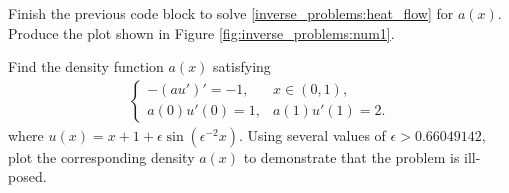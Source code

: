 
	Finish the previous code block to solve \eqref{inverse_problems:heat_flow} for $a(x)$.
	Produce the plot shown in Figure \ref{fig:inverse_problems:num1}.

	Find the density function $a(x)$ satisfying 
	\begin{align}
	\begin{cases}
		-(au')' = -1, & x \in (0,1),\\
		a(0)u'(0) = 1, & a(1)u'(1) = 2.
	\end{cases} \label{inverse_problems:ill_posed}
	\end{align}
	where $u(x) = x + 1 + \epsilon \sin(\epsilon^{-2}x)$.  Using several values of $\epsilon  > 0.66049142$, plot the corresponding density $a(x)$ to demonstrate that the problem is ill-posed.
